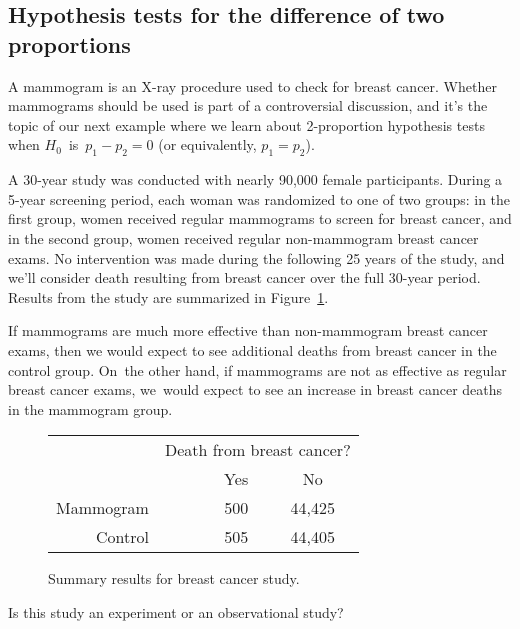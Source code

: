 \subsection%
    {Hypothesis tests for the difference of two proportions}


A mammogram is an X-ray procedure used to check for
breast cancer.
Whether mammograms should be used is part of a
controversial discussion, and it's the topic of our
next example where we learn about 2-proportion
hypothesis tests when $H_0$~is~$p_1 - p_2 = 0$
(or equivalently, $p_1 = p_2$).

A 30-year study was conducted with nearly 90,000 female participants. During a 5-year screening period, each woman was randomized to one of two groups: in the first group, women received regular mammograms to screen for breast cancer, and in the second group, women received regular non-mammogram breast cancer exams. No intervention was made during the following 25 years of the study, and we'll consider death resulting from breast cancer over the full 30-year period. Results from the study are summarized in Figure~\ref{mammogramStudySummaryTable}.

If mammograms are much more effective than non-mammogram breast cancer exams, then we would expect to see additional deaths from breast cancer in the control group. On~the other hand, if mammograms are not as effective as regular breast cancer exams, we~would expect to see an increase in breast cancer deaths in the mammogram group.

\begin{figure}[h]
\centering
\begin{tabular}{rrcc}
	& \multicolumn{3}{c}{Death from breast cancer?} \\
  \cline{2-4}
 & \ \hspace{3mm}\ & Yes & No \\
  \hline
Mammogram && 500 & 44,425 \\
Control && 505 & 44,405 \\
   \hline
\end{tabular}
\caption{Summary results for breast cancer study.}
\label{mammogramStudySummaryTable}
\end{figure}

\begin{exercisewrap}
\begin{nexercise}
Is this study an experiment or an observational study?\footnotemark{}
\end{nexercise}
\end{exercisewrap}

